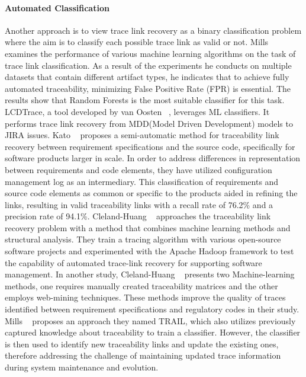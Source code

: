 \paragraph{Automated Classification} Another approach is to view trace link recovery as a binary classification problem where the aim is to classify each possible trace link as valid or not. Mills~\cite{mills-2017} examines the performance of various machine learning algorithms on the task of trace link classification. As a result of the experiments he conducts on multiple datasets that contain different artifact types, he indicates that to achieve fully automated traceability, minimizing False Positive Rate (FPR) is essential. The results show that Random Forests is the most suitable classifier for this task.
LCDTrace, a tool developed by van Oosten \etal{}~\cite{VANOOSTEN2023107226}, leverages ML classifiers. It performs trace link recovery from MDD(Model Driven Development) models to JIRA issues.
Kato \etal{}~\cite{kato-2013} proposes a semi-automatic method for traceability link recovery between requirement specifications and the source code, specifically for software products larger in scale. In order to address differences in representation between requirements and code elements, they have utilized configuration management log as an intermediary. This classification of requirements and source code elements as common or specific to the products aided in refining the links, resulting in valid traceability links with a recall rate of 76.2\% and a precision rate of 94.1\%. 
Cleland-Huang \etal{}~\cite{jane-2012} approaches the traceability link recovery problem with a method that combines machine learning methods and structural analysis. They train a tracing algorithm with various open-source software projects and experimented with the Apache Hadoop framework to test the capability of automated trace-link recovery for supporting software management.
In another study, Cleland-Huang \etal{}~\cite{cleland-huang-2010} presents two Machine-learning methods, one requires manually created traceability matrices and the other employs web-mining techniques. These methods improve the quality of traces identified between requirement specifications and regulatory codes in their study.
Mills \etal{}~\cite{mills-2018} proposes an approach they named TRAIL, which also utilizes previously captured knowledge about traceability to train a classifier. However, the classifier is then used to identify new traceability links and update the existing ones, therefore addressing the challenge of maintaining updated trace information during system maintenance and evolution.

